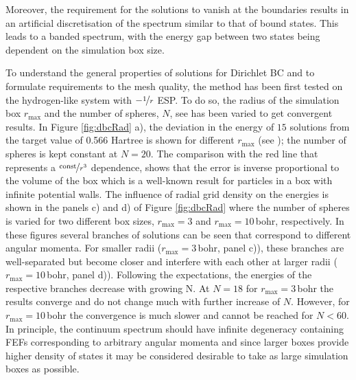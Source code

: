 Moreover, the requirement for the solutions to vanish at the boundaries results in an artificial discretisation of the spectrum similar to that of bound states.
This leads to a banded spectrum, with the energy gap between two states being dependent on the simulation box size.

To understand the general properties of solutions for Dirichlet BC and to formulate requirements to the mesh quality, the method has been first tested on the hydrogen-like system with $-\nicefrac{1}{r}$ ESP.
To do so, the radius of the simulation box $r_\text{max}$ and the number of spheres, $N$, see  has been varied to get convergent results.
In Figure \ref{fig:dbcRad} a), the deviation in the energy of $15$ solutions from the target value of 0.566 Hartree is shown for different $r_\text{max}$ (see ); the number of spheres is kept constant at $N=20$.
The comparison with the red line that represents a $\nicefrac{\text{const}}{r^3}$ dependence, shows that the error is inverse proportional to the volume of the box which is a well-known result for particles in a box with infinite potential walls. 
The influence of radial grid density on the energies is shown in the panels c) and d) of Figure \ref{fig:dbcRad} where the number of spheres is varied for two different box sizes, $r_\text{max}=3$ and $r_\text{max}=10\,$bohr, respectively.
In these figures several branches of solutions can be seen that correspond to different angular momenta.
For smaller radii ($r_\text{max}=3\,$bohr, panel c)), these branches are well-separated but become closer and interfere with each other at larger radii ($r_\text{max}=10\,$bohr, panel d)).
Following the expectations, the energies of the respective branches decrease with growing N.
At $N=18$ for $r_\text{max}=3\,$bohr the results converge and do not change much with further increase of $N$.
However, for $r_\text{max}=10\,$bohr the convergence is much slower and cannot be reached for $N<60$.
In principle, the continuum spectrum should have infinite degeneracy containing FEFs corresponding to arbitrary angular momenta and since larger boxes provide higher density of states it may be considered desirable to take as large simulation boxes as possible.
